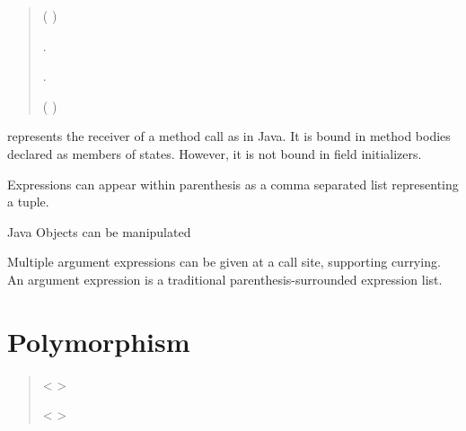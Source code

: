 \begin{quote}


 {}

 {}

 {}

 (  ) 

 {} . 

 {} . 

 {}   


 {} 




 (   ) 

\end{quote}

 represents the receiver of a method call as in Java.  It is 
bound in method bodies declared as members of states.  However,
it is not bound in field initializers.

Expressions can appear within parenthesis as a comma
separated list representing a tuple.

Java Objects can be manipulated

Multiple argument expressions can be given at a call
site, supporting currying.  An argument expression is a
traditional parenthesis-surrounded expression list.


\section{Polymorphism}

\begin{quote}


 <   >


 {}  


 {}

 {}

 {}


 <   >

\end{quote}

